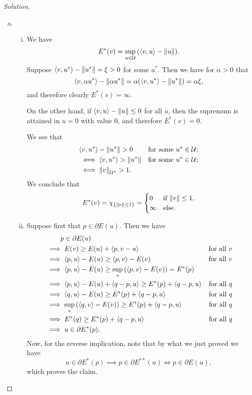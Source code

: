 \documentclass{article}
\theoremstyle{plain}
\theoremstyle{remark}
\newenvironment{solution}{\begin{proof}[Solution]\renewcommand\qedsymbol{}}{\end{proof}}
\newcommand{\Cal}{\mathcal}
\newcommand\UU{\Cal U}
\DeclarePairedDelimiter{\ang}{\langle}{\rangle}
\newcommand\pt\partial
\begin{document}
\begin{solution}
	\begin{enumerate}[(a)]
		\item \begin{enumerate}[(i)]
			\item We have
			\[
			E^*(v) = \sup_{u \in \UU} \qty(\ang{v, u} - \norm{u}). 
			\]
			Suppose $\ang{v, u^*} - \norm{u^*} = \xi > 0$ for some $u^*$. Then we have for $\alpha > 0$ that
			\[
			\ang{v, \alpha u^*} - \norm{\alpha u^*} = \alpha \qty(\ang{v, u^*} - \norm{u^*}) = \alpha\xi, 
			\]
			and therefore clearly $E^*(v) = \infty$. 
			
			On the other hand, if $\ang{v, u} - \norm{u}\leq0$ for all $u$, then the supremum is attained in $u = 0$ with value $0$, and therefore $E^*(v) = 0$. 
			
			We see that
			\begin{align*}
				&\ang{v, u^*} - \norm{u^*} > 0 &\text{for some $u^* \in \UU$}; \\
				&\iff \ang{v, u^*} > \norm{u^*} &\text{for some $u^* \in \UU$}; \\
				&\iff \norm{v}_{\UU^*} > 1. 
			\end{align*}
		We conclude that
		\[
		E^*(v) = \chi_\qty{\norm{v} \leq 1} = \begin{cases}
			0 &\text{if $\norm{v} \leq 1$}, \\ \infty &\text{else.}
		\end{cases}
		\]
		
		\item Suppose first that $p \in \pt E(u)$. Then we have
		\begin{align*}
&\phantom{\implies}	p \in \pt E(u) \\
&\implies E(v) \geq E(u) + \ang{p, v - u} &\text{for all $v$} \\
&\implies \ang{p, u} - E(u) \geq \ang{p, v} - E(v) &\text{for all $v$} \\
&\implies \ang{p, u} - E(u) \geq \sup_v \qty(\ang{p, v} - E(v)) = E^*(p) \\
&\implies \ang{p, u} - E(u) + \ang{q - p, u} \geq E^*(p) + \ang{q - p, u} &\text{for all $q$} \\
&\implies \ang{q, u} - E(u) \geq E^*(p) + \ang{q - p, u} &\text{for all $q$} \\
&\implies \sup_v \qty(\ang{q, v} - E(v)) \geq E^*(p) + \ang{q - p, u} &\text{for all $q$} \\
&\implies E^*(q) \geq E^*(p) + \ang{q -p, u} &\text{for all $q$} \\
&\implies u \in \pt E^*(p). 
		\end{align*}
	Now, for the reverse implication, note that by what we just proved we have
	\[
	u \in \pt E^*(p) \implies p \in \pt E^{**}(u) \iff p \in \pt E(u), 
	\]
	which proves the claim.
		\end{enumerate}
	\end{enumerate}
\end{solution}
\end{document}

